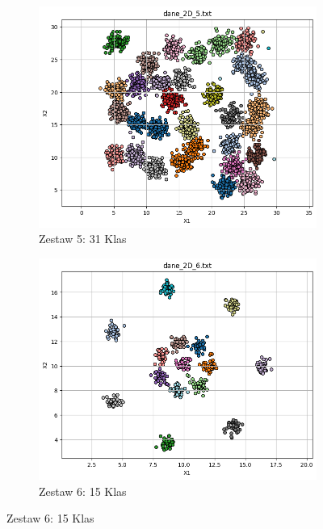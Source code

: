 \documentclass[polish,12pt,a4paper]{extarticle}
\begin{document}
\begin{figure}[h!]
    \hfill
    \begin{subfigure}[b]{0.30\textwidth}
        \includegraphics[width=\linewidth]{img/hierarchical/centroid/data5.png}
        \captionsetup{labelformat=empty}
        \caption{Zestaw 5: 31 Klas}
    \end{subfigure}
    \hfill
    \begin{subfigure}[b]{0.30\textwidth}
        \includegraphics[width=\linewidth]{img/hierarchical/centroid/data6.png}
        \captionsetup{labelformat=empty}
        \caption{Zestaw 6: 15 Klas}
    \end{subfigure}
    \hfill
\end{figure}
\end{document}
